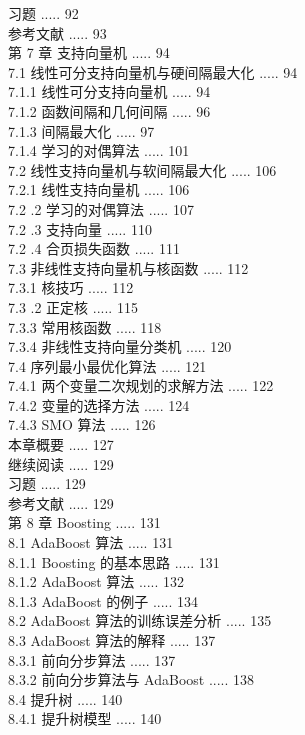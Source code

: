 \documentclass[10pt]{article}
\begin{document}
\begin{CJK*}{UTF8}{bsmi}
习题 ..... 92\\
参考文献 ..... 93\\
第 7 章 支持向量机 ..... 94\\
7.1 线性可分支持向量机与硬间隔最大化 ..... 94\\
7.1.1 线性可分支持向量机 ..... 94\\
7.1.2 函数间隔和几何间隔 ..... 96\\
7.1.3 间隔最大化 ..... 97\\
7.1.4 学习的对偶算法 ..... 101\\
7.2 线性支持向量机与软间隔最大化 ..... 106\\
7.2.1 线性支持向量机 ..... 106\\
7.2 .2 学习的对偶算法 ..... 107\\
7.2 .3 支持向量 ..... 110\\
7.2 .4 合页损失函数 ..... 111\\
7.3 非线性支持向量机与核函数 ..... 112\\
7.3.1 核技巧 ..... 112\\
7.3 .2 正定核 ..... 115\\
7.3.3 常用核函数 ..... 118\\
7.3.4 非线性支持向量分类机 ..... 120\\
7.4 序列最小最优化算法 ..... 121\\
7.4.1 两个变量二次规划的求解方法 ..... 122\\
7.4.2 变量的选择方法 ..... 124\\
7.4.3 SMO 算法 ..... 126\\
本章概要 ..... 127\\
继续阅读 ..... 129\\
习题 ..... 129\\
参考文献 ..... 129\\
第 8 章 Boosting ..... 131\\
8.1 AdaBoost 算法 ..... 131\\
8.1.1 Boosting 的基本思路 ..... 131\\
8.1.2 AdaBoost 算法 ..... 132\\
8.1.3 AdaBoost 的例子 ..... 134\\
8.2 AdaBoost 算法的训练误差分析 ..... 135\\
8.3 AdaBoost 算法的解释 ..... 137\\
8.3.1 前向分步算法 ..... 137\\
8.3.2 前向分步算法与 AdaBoost ..... 138\\
8.4 提升树 ..... 140\\
8.4.1 提升树模型 ..... 140\\

\end{CJK*}
\end{document}
